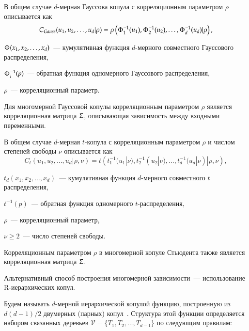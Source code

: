 В общем случае $d$-мерная Гауссова копула с корреляционным параметром $\rho$ описывается как~\cite{Emb2001}
\begin{equation} \label{nCop}
C_{Gauss}(u_1, u_2,\ldots, u_d|\rho) = \rho \left( \Upphi_1^{-1} (u_1), \Upphi_2^{-1} (u_2), \ldots, \Upphi_d^{-1} (u_d) | \rho \right),
\end{equation}
\begin{where}
    \item $\Upphi(x_1, x_2, \dots, x_d)$~--- кумулятивная функция $d$-мерного совместного Гауссового распределения,
    \item $\Upphi_i^{-1}(p)$~--- обратная функция одномерного Гауссового распределения,
    \item $\rho$~--- корреляционный параметр.
\end{where}
%
Для многомерной Гауссовой копулы корреляционным параметром $\rho$ является корреляционная матрица $\Upsigma$, описывающая зависимость между входными переменными.

В общем случае $d$-мерная $t$-копула с корреляционным параметром $\rho$ и числом степеней свободы $\nu$ описывается как~\cite{Emb2001}
\begin{equation} \label{tCop}
C_{t}(u_1, u_2,\ldots, u_d|\rho, \nu) = t \left( t_1^{-1} (u_1|\nu), t_2^{-1} (u_2|\nu), \ldots, t_d^{-1} (u_d|\nu) | \rho, \nu \right),
\end{equation}
\begin{where}
    \item $t_d(x_1, x_2, \dots,x_d)$~--- кумулятивная функция $d$-мерного совместного $t$\-распределения,
    \item $t^{-1}(p)$~--- обратная функция одномерного $t$-распределения,
    \item $\rho$~--- корреляционный параметр,
    \item $\nu \ge 2$~--- число степеней свободы.
\end{where}

Корреляционным параметром $\rho$ в многомерной копуле Стьюдента также является корреляционная матрица $\Upsigma$.

Альтернативный способ построения многомерной зависимости~--- использование R-иерархических копул. 

Будем называть $d$-мерной иерархической копулой функцию, построенную из $d(d - 1)/2$  двумерных (парных) копул~\cite{Bedfort2002}. Структура этой функции определяется набором связанных деревьев $\mathcal{V} =\{T_1, T_2, \ldots, T_ {d-1}\}$ по следующим правилам:

